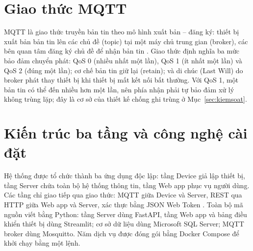 \section{Giao thức MQTT}
\label{sec:mqtt}

MQTT là giao thức truyền bản tin theo mô hình xuất bản -- đăng ký: thiết bị xuất bản bản tin lên các chủ đề (topic) tại một máy chủ trung gian (broker), các bên quan tâm đăng ký chủ đề để nhận bản tin \cite{mqtt5}. Giao thức định nghĩa ba mức bảo đảm chuyển phát: QoS 0 (nhiều nhất một lần), QoS 1 (ít nhất một lần) và QoS 2 (đúng một lần); cơ chế bản tin giữ lại (retain); và di chúc (Last Will) do broker phát thay thiết bị khi thiết bị mất kết nối bất thường. Với QoS 1, một bản tin có thể đến nhiều hơn một lần, nên phía nhận phải tự bảo đảm xử lý không trùng lặp; đây là cơ sở của thiết kế chống ghi trùng ở Mục~\ref{sec:kiemsoat}.

\section{Kiến trúc ba tầng và công nghệ cài đặt}
\label{sec:congnghe}

Hệ thống được tổ chức thành ba ứng dụng độc lập: tầng Device giả lập thiết bị, tầng Server chứa toàn bộ hệ thống thông tin, tầng Web app phục vụ người dùng. Các tầng chỉ giao tiếp qua giao thức: MQTT giữa Device và Server, REST qua HTTP giữa Web app và Server, xác thực bằng JSON Web Token \cite{rfc7519}. Toàn bộ mã nguồn viết bằng Python: tầng Server dùng FastAPI, tầng Web app và bảng điều khiển thiết bị dùng Streamlit; cơ sở dữ liệu dùng Microsoft SQL Server; MQTT broker dùng Mosquitto. Năm dịch vụ được đóng gói bằng Docker Compose để khởi chạy bằng một lệnh.

